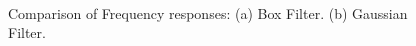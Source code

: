 \begin{figure}[h]
\begin{dBox}
\centering
  \mbox{
   }
   \caption{Comparison of Frequency responses: (a) Box Filter. (b) Gaussian Filter. \label{fig:fig5} }   
\end{dBox}   
\end{figure}

